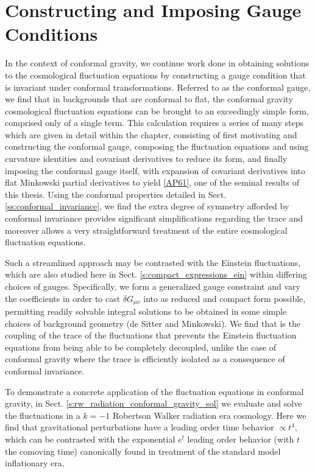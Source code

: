 
\chapter{Constructing and Imposing Gauge Conditions}
\label{c:constructing_gauge_conditions}
In the context of conformal gravity, we continue work done in obtaining solutions to the cosmological fluctuation equations \cite{mannheim_2012} by constructing a gauge condition that is invariant under conformal transformations. Referred to as the conformal gauge, we find that in backgrounds that are conformal to flat, the conformal gravity cosmological fluctuation equations can be brought to an exceedingly simple form, comprised only of a single term. This calculation requires a series of many steps which are given in detail within the chapter, consisting of first motivating and constructing the conformal gauge, composing the fluctuation equations and using curvature identities and covariant derivatives to reduce its form, and finally imposing the conformal gauge itself, with expansion of covariant derivatives into flat Minkowski partial derivatives to yield \eqref{AP61}, one of the seminal results of this thesis. Using the conformal properties detailed in Sect. \ref{ss:conformal_invariance}, we find the extra degree of symmetry afforded by conformal invariance provides significant simplifications regarding the trace and moreover allows a very straightforward treatment of the entire cosmological fluctuation equations.

Such a streamlined approach may be contrasted with the Einstein fluctuations, which are also studied here in Sect. \ref{s:compact_expressions_ein} within differing choices of gauges. Specifically, we form a generalized gauge constraint and vary the coefficients in order to cast $\delta G_{\mu\nu}$ into as reduced and compact form possible, permitting readily solvable integral solutions to be obtained in some simple choices of background geometry (de Sitter and Minkowski). We find that is the coupling of the trace of the fluctuations that prevents the Einstein fluctuation equations from being able to be completely decoupled, unlike the case of conformal gravity where the trace is efficiently isolated as a consequence of conformal invariance.

To demonstrate a concrete application of the fluctuation equations in conformal gravity, in Sect. \ref{s:rw_radiation_conformal_gravity_sol} we evaluate and solve the fluctuations in a $k=-1$ Robertson Walker radiation era cosmology. Here we find that gravitational perturbations have a leading order time behavior $\propto t^4$, which can be contrasted with the exponential $e^t$ leading order behavior (with $t$ the comoving time) canonically found in treatment of the standard model inflationary era. 

